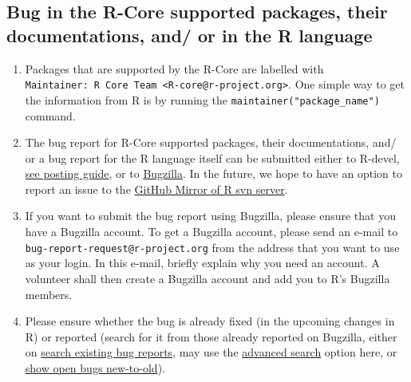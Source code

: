\documentclass[
]{book}
\begin{document}
\hypertarget{RCorePkgBug}{%
\subsection{Bug in the R-Core supported packages, their documentations, and/ or in the R language}\label{RCorePkgBug}}

\begin{enumerate}
\def\labelenumi{\arabic{enumi}.}
\item
  Packages that are supported by the R-Core are labelled with \texttt{Maintainer:\ R\ Core\ Team\ \textless{}R-core@r-project.org\textgreater{}}. One simple way to get the information from R is by running the \texttt{maintainer("package\_name")} command.
\item
  The bug report for R-Core supported packages, their documentations, and/ or a bug report for the R language itself can be submitted either to R-devel, \href{https://www.r-project.org/posting-guide.html\#which_list}{see posting guide}, or to \href{https://bugs.r-project.org/bugzilla/}{Bugzilla}. In the future, we hope to have an option to report an issue to the \href{https://github.com/r-devel/r-svn/issues}{GitHub Mirror of R svn server}.
\item
  If you want to submit the bug report using Bugzilla, please ensure that you have a Bugzilla account. To get a Bugzilla account, please send an e-mail to \texttt{bug-report-request@r-project.org} from the address that you want to use as your login. In this e-mail, briefly explain why you need an account. A volunteer shall then create a Bugzilla account and add you to R's Bugzilla members.
\item
  Please ensure whether the bug is already fixed (in the upcoming changes in R) or reported (search for it from those already reported on Bugzilla, either on \href{https://bugs.r-project.org/bugzilla/query.cgi}{search existing bug reports}, may use the \href{https://bugs.r-project.org/bugzilla/query.cgi?format=advanced}{advanced search} option here, or \href{https://bugs.r-project.org/bugzilla/buglist.cgi?bug_file_loc_type=allwordssubstr\&bug_status=NEW\&bug_status=ASSIGNED\&bug_status=CONFIRMED\&bug_status=REOPENED\&bug_status=UNCONFIRMED\&bugidtype=include\&chfieldto=Now\&cmdtype=doit\&emailassigned_to1=1\&emailassigned_to2=1\&emailcc2=1\&emailreporter2=1\&emailtype1=substring\&emailtype2=substring\&field0-0-0=noop\&long_desc_type=substring\&order=bugs.delta_ts\%20desc\&query_format=advanced\&short_desc_type=allwordssubstr\&type0-0-0=noop}{show open bugs new-to-old}).
\end{enumerate}
\end{document}
